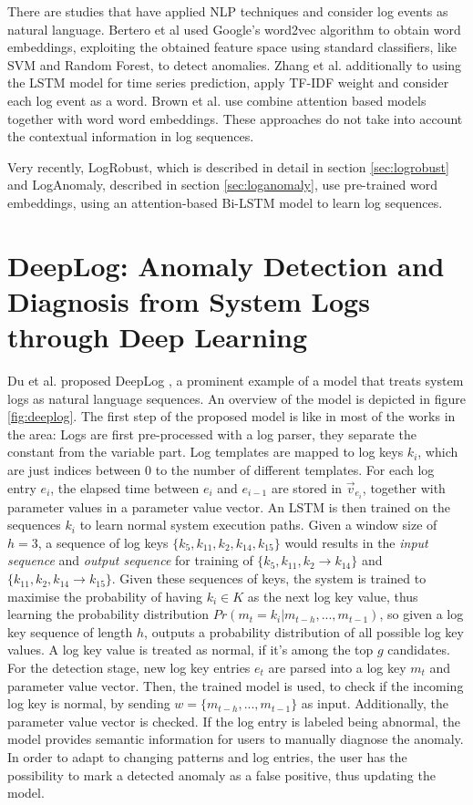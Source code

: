 There are studies that have applied NLP techniques and consider log events as natural language. Bertero et al \cite{bertero2017experience} used Google's word2vec algorithm to obtain word embeddings, exploiting the obtained feature space using standard classifiers, like SVM and Random Forest, to detect anomalies. Zhang et al. \cite{zhang2016automated} additionally to using the LSTM model for time series prediction, apply  TF-IDF weight and consider each log event as a word. Brown et al. \cite{brown2018recurrent} use combine attention based models together with word word embeddings. These approaches do not take into account the contextual information in log sequences.

Very recently, LogRobust, which is described in detail in section \ref{sec:logrobust} and LogAnomaly, described in section \ref{sec:loganomaly}, use pre-trained word embeddings, using an attention-based Bi-LSTM model to learn log sequences.


\section{DeepLog: Anomaly Detection and Diagnosis from System Logs through Deep Learning \label{sec:deeplog}}
Du et al. proposed DeepLog \cite{du2017deeplog}, a prominent example of a model that treats system logs as natural language sequences. An overview of the model is depicted in figure \ref{fig:deeplog}. The first step of the proposed model is like in most of the works in the area: Logs are first pre-processed with a log parser, they separate the constant from the variable part. Log templates are mapped to log keys $k_i$, which are just indices between $0$ to the number of different templates. For each log entry $e_i$, the elapsed time between $e_i$ and $e_{i-1}$ are stored in $\vec{v}_{e_i}$, together with parameter values in a parameter value vector. An LSTM is then trained on the sequences $k_i$ to learn normal system execution paths. Given a window size of $h=3$, a sequence of log keys $\{k_5, k_{11}, k_2, k_{14}, k_{15}\}$ would results in the \textit{input sequence} and \textit{output sequence} for training of $\{k_{5},k_{11},k_{2} \rightarrow k_{14}\}$ and $\{k_{11},k_{2},k_{14} \rightarrow k_{15}\}$. Given these sequences of keys, the system is trained to maximise the probability of having $k_i \in K$ as the next log key value, thus learning the probability distribution $Pr(m_t = k_i | m_{t-h},...,m_{t-1})$, so given a log key sequence of length $h$, outputs a probability distribution of all possible log key values. A log key value is treated as normal, if it's among the top $g$ candidates.
 For the detection stage, new log key entries $e_t$ are parsed into a log key $m_t$ and parameter value vector. Then, the trained model is used, to check if the incoming log key is normal, by sending $w = \{m_{t-h}, ..., m_{t-1}\}$ as input. Additionally, the parameter value vector is checked. If the log entry is labeled being abnormal, the model provides semantic information for users to manually diagnose the anomaly. In order to adapt to changing patterns and log entries, the user has the possibility to mark a detected anomaly as a false positive, thus updating the model.

